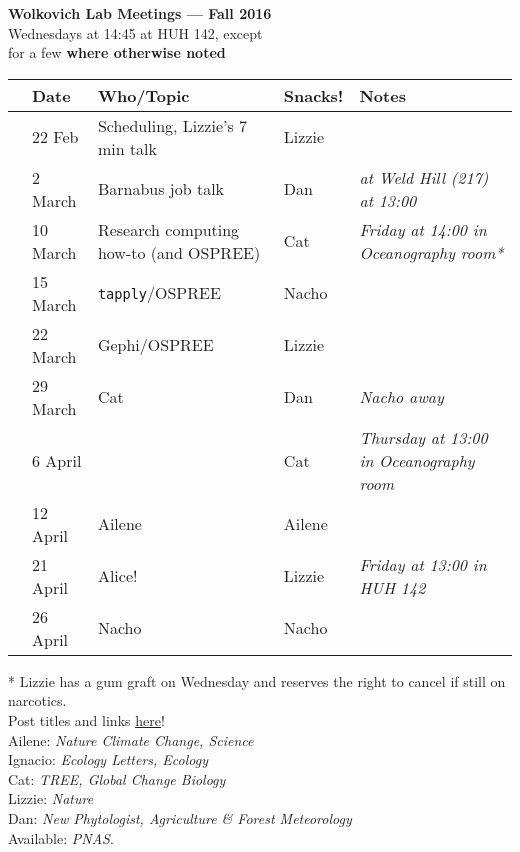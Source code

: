 \documentclass[11pt]{article}
\begin{document}
 
\raggedright
{}

\begin{center} 
{\large \textbf{Wolkovich Lab Meetings --- Fall 2016}} \\ [2pt]
Wednesdays at 14:45 at HUH  142, except \\ for a few {\bf where otherwise noted}\\
\end{center} 

\begin{center}
\begin{tabular}{ p{0.2 cm}  p{2 cm}  p{5 cm}  p{2 cm}  p{4 cm} }  \hline \hline
 & \textbf{Date}
   & \textbf{Who/Topic}
      & \textbf{Snacks!} 
         & \textbf{Notes} \\ 
\hline \hline
 & 22 Feb & Scheduling, Lizzie's 7 min talk & Lizzie       &  \\\hline
 & 2 March  & Barnabus job talk & Dan &   \emph{at Weld Hill (217) at 13:00} \\\hline
 & 10 March & Research computing how-to (and OSPREE) & Cat     & \emph{Friday at 14:00 in Oceanography room*} \\\hline
 & 15 March & \verb|tapply|/OSPREE &  Nacho  &  \\\hline 
& 22 March & Gephi/OSPREE & Lizzie  & \\\hline
 & 29 March & Cat & Dan & \emph{Nacho away}\\\hline
 & 6 April & & Cat &  \emph{Thursday at 13:00 in Oceanography room}\\\hline
 & 12 April &  Ailene & Ailene &  \\\hline
 & 21 April & Alice! & Lizzie  & \emph{Friday at 13:00 in HUH 142}\\\hline 
 & 26 April & Nacho &  Nacho & \\\hline  
\hline
\end{tabular}
\end{center}
* Lizzie has a gum graft on Wednesday and reserves the right to cancel if still on narcotics. \\
\vspace{6pt}
 Post titles and links \href{https://docs.google.com/document/d/1j0WdDbjdp8ERLSO7whvtnP-tOblYMlX33TSCXy_uRKo/edit?usp=sharing}{\underline{here}}!\\
Ailene: \emph{Nature Climate Change, Science}\\
Ignacio: \emph{Ecology Letters, Ecology}\\
Cat: \emph{TREE, Global Change Biology}\\
Lizzie: \emph{Nature}\\
Dan: \emph{New Phytologist, Agriculture \& Forest Meteorology}\\
Available: \emph{PNAS}.\\
\end{document}
